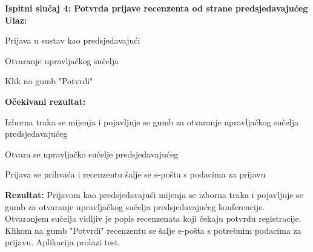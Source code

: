 			
			 \noindent \textbf{Ispitni slučaj 4: Potvrda prijave recenzenta od strane predsjedavajućeg}\\
			  \textbf{Ulaz:}
			 \begin{packed_enum}
			 	\item {Prijava u sustav kao predsjedavajući}
			 	\item {Otvaranje upravljačkog sučelja}
			 	\item {Klik na gumb "Potvrdi"}
			 \end{packed_enum}
			  \textbf{Očekivani rezultat:}
			 \begin{packed_enum}
			 	\item {Izborna traka se mijenja i pojavljuje se gumb za otvaranje upravljačkog sučelja predsjedavajućeg}
			 	\item {Otvara se upravljačko sučelje predsjedavajućeg}
			 	\item {Prijava se prihvaća i recenzentu šalje se e-pošta s podacima za prijavu}
			 \end{packed_enum}
			 \textbf{Rezultat: }Prijavom kao predsjedavajući mijenja se izborna traka i pojavljuje se gumb za otvaranje upravljačkog sučelja predsjedavajućeg konferencije. Otvaranjem sučelja vidljiv je popis recenzenata koji čekaju potvrdu registracije. Klikom na gumb "Potvrdi" recenzentu se šalje e-pošta s potrebnim podacima za prijavu. {\color{green} Aplikacija prolazi test.}\\
			 
